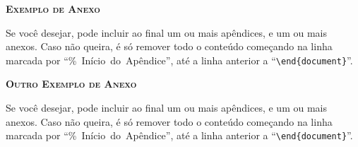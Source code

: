 \documentclass[a4paper, 12pt]{ppgeb}
\begin{document}
\begin{flushright}

\end{flushright}

\noindent\begin{large}{\bfseries\scshape Exemplo de Anexo}\end{large} \label{sec:anexo1}

\vspace{24pt}

Se você desejar, pode incluir ao final um ou mais apêndices, e um ou mais anexos. Caso não queira, é só remover todo o conteúdo começando na linha marcada por ``\%~Início~do~Apêndice'', até a linha anterior a ``\verb|\end{document}|''.

\clearpage
\begin{flushright}
\end{flushright}

\noindent\begin{large}{\bfseries\scshape Outro Exemplo de Anexo}\end{large} \label{sec:anexo2}

\vspace{24pt}

Se você desejar, pode incluir ao final um ou mais apêndices, e um ou mais anexos. Caso não queira, é só remover todo o conteúdo começando na linha marcada por ``\%~Início~do~Apêndice'', até a linha anterior a ``\verb|\end{document}|''.
\end{document}
